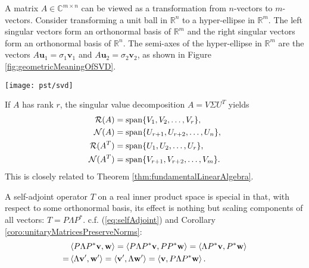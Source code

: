 
\begin{rem}%
  \label{rem:geometryOfSVD}
  A matrix $A\in \mathbb{C}^{m\times n}$
  can be viewed as a transformation
  from $n$-vectors to $m$-vectors.
  Consider transforming a unit ball in $\mathbb{R}^n$
  to a hyper-ellipse in $\mathbb{R}^m$.
  The left singular vectors
  form an orthonormal basis of $\mathbb{R}^m$
  and the right singular vectors
  form an orthonormal basis of $\mathbb{R}^n$.
  The semi-axes of the hyper-ellipse in $\mathbb{R}^m$
  are the vectors $A\mathbf{u}_1=\sigma_1\mathbf{v}_1$
  and $A\mathbf{u}_2=\sigma_2\mathbf{v}_2$, 
  as shown in Figure \ref{fig:geometricMeaningOfSVD}. 
\end{rem}

\begin{Figure}
  \centering
  \texttt{[image: pst/svd]}
  \label{fig:geometricMeaningOfSVD}
\end{Figure}

\begin{rem}
  If $A$ has rank $r$, 
  the singular value decomposition $A = V\Sigma U^T$ yields
  \begin{align*}
    {\cal R}(A) &= \mathrm{span}\{V_1, V_2, \ldots, V_r\},
    \\
    {\cal N}(A) &= \mathrm{span}\{U_{r+1}, U_{r+2}, \ldots, U_n\},
    \\
    {\cal R}(A^T) &= \mathrm{span}\{U_1, U_2, \ldots, U_r\},
    \\
    {\cal N}(A^T) &= \mathrm{span}\{V_{r+1}, V_{r+2}, \ldots, V_m\}.
  \end{align*}
  This is closely related to Theorem \ref{thm:fundamentalLinearAlgebra}.
\end{rem}

\begin{rem}
  A self-adjoint operator $T$ on a real inner product space
   is special in that, 
   with respect to some orthonormal basis, 
   its effect is nothing but
   scaling components of all vectors:
   $T=P\Lambda P^*$. 
   c.f. (\ref{eq:selfAdjoint})
   and Corollary \ref{coro:unitaryMatricesPreserveNorms}:
   \begin{align*}
     &\left\langle P\Lambda P^*\mathbf{v},\mathbf{w} \right\rangle
     = \left\langle P\Lambda P^* \mathbf{v}, P  P^* \mathbf{w} \right\rangle
       = \left\langle \Lambda P^* \mathbf{v},  P^* \mathbf{w} \right\rangle
       \\
     =& \left\langle \Lambda \mathbf{v}', \mathbf{w}' \right\rangle
     = \left\langle  \mathbf{v}', \Lambda\mathbf{w}' \right\rangle
     = \left\langle \mathbf{v}, P\Lambda P^*\mathbf{w} \right\rangle. 
   \end{align*}
%
\end{rem}

